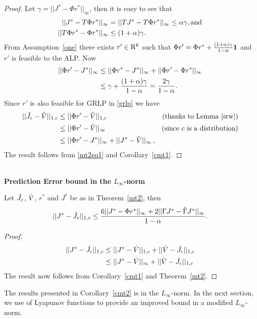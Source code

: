 \begin{proof}
Let $\gamma=||J^*-\Phi r^*||_\infty$, then  it is easy to see that
\begin{align}
||J^*-T\Phi r^*||_\infty&=||TJ^*-T\Phi r^*||_\infty\leq\alpha\gamma,\mb\text{and}\nn\\\vspace{10pt}
||T\Phi r^*-\Phi r^*||_\infty&\leq(1+\alpha)\gamma.
\end{align}
From Assumption~\ref{one} there exists $r'\in \mathrm{R}^k$ such that $\Phi r'=\Phi r^*+\frac{(1+\alpha)\gamma}{1-\alpha}\mathbf{1}$ and $r'$ is feasible to the ALP. 
Now
\begin{align}
||\Phi r'-J^*||_\infty&\leq ||\Phi r^* -J^*||_\infty+||\Phi r'-\Phi r^*||_\infty\nn\\&\leq \gamma+\frac{(1+\alpha)\gamma}{1-\alpha}=\frac{2\gamma}{1-\alpha}.
\label{mt2eq1}
\end{align}
Since $r'$ is also feasible for GRLP in \eqref{grlp} we have
\begin{align}
||\hj-\hv||_{1,c}&\leq||\Phi r'-\hv||_{1,c}\nn &(\text{thanks to Lemma~\ref{srw}}) \\ %
&\leq||\Phi r'-\hv||_\infty\mb & \text{(since $c$ is a distribution)}\nn\\
&\leq||\Phi r'-J^*||_\infty+||J^*-\hv||_\infty\,,\nn
\end{align}
The result follows from \eqref{mt2eq1} and Corollary~\ref{cmt1}.
\end{proof}\\
\textbf{Prediction Error bound in the $L_\infty$-norm}\\
\begin{corollary}\label{cmt2}
Let $\hat{J}_c$, $\hat{V}$, $r^*$ and $J^*$ be as in Theorem~\ref{mt2}, then 
\begin{align}\label{finalbnd}
||J^*-\hj||_{1,c}\leq\frac{6 ||J^*-\Phi r^*||_\infty+2||\Gamma J^*-\hg J^*||_\infty}{1-\alpha}.
\end{align}
\end{corollary}
\begin{proof}
\begin{align}
||J^*-\hj||_{1,c}&\leq||J^*-\hv||_{1,c}+||\hv-\hj||_{1,c}\nn\\\vspace{10pt}
&\leq||J^*-\hv||_\infty+||\hv-\hj||_{1,c}\nn
\end{align}
The result now follows from Corollary~\ref{cmt1} and Theorem~\ref{mt2}.
\end{proof}
The results presented in Corollary~\ref{cmt2} is in the $L_\infty$-norm. In the next section, we use of Lyapunov functions to provide an improved bound in a modified $L_\infty$-norm.
